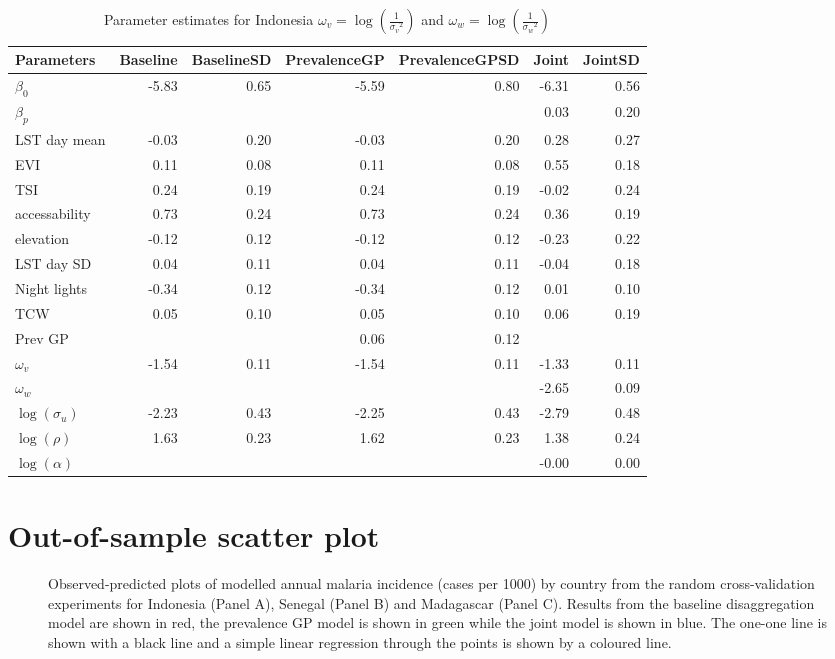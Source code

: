 \documentclass[10pt,a4]{article}
\begin{document}
\begin{table}[ht]
\centering
\begin{tabular}{lrrrrrr}
  \hline
Parameters & Baseline & BaselineSD & PrevalenceGP & PrevalenceGPSD & Joint & JointSD \\ 
  \hline
$\beta_0$ & -5.83 & 0.65 & -5.59 & 0.80 & -6.31 & 0.56 \\ 
  $\beta_p$ &  &  &  &  & 0.03 & 0.20 \\ 
  LST day mean & -0.03 & 0.20 & -0.03 & 0.20 & 0.28 & 0.27 \\ 
  EVI & 0.11 & 0.08 & 0.11 & 0.08 & 0.55 & 0.18 \\ 
  TSI & 0.24 & 0.19 & 0.24 & 0.19 & -0.02 & 0.24 \\ 
  accessability & 0.73 & 0.24 & 0.73 & 0.24 & 0.36 & 0.19 \\ 
  elevation & -0.12 & 0.12 & -0.12 & 0.12 & -0.23 & 0.22 \\ 
  LST day SD & 0.04 & 0.11 & 0.04 & 0.11 & -0.04 & 0.18 \\ 
  Night lights & -0.34 & 0.12 & -0.34 & 0.12 & 0.01 & 0.10 \\ 
  TCW & 0.05 & 0.10 & 0.05 & 0.10 & 0.06 & 0.19 \\ 
  Prev GP &  &  & 0.06 & 0.12 &  &  \\ 
  $\omega_v$ & -1.54 & 0.11 & -1.54 & 0.11 & -1.33 & 0.11 \\ 
  $\omega_w$ &  &  &  &  & -2.65 & 0.09 \\ 
  $\log(\sigma_u)$ & -2.23 & 0.43 & -2.25 & 0.43 & -2.79 & 0.48 \\ 
  $\log(\rho)$ & 1.63 & 0.23 & 1.62 & 0.23 & 1.38 & 0.24 \\ 
  $\log(\alpha)$ &  &  &  &  & -0.00 & 0.00 \\ 
   \hline
\end{tabular}
\label{parsidn}
\caption{Parameter estimates for Indonesia $\omega_v = \log\left(\frac{1}{{\sigma_v}^2}\right)$ and $\omega_w = \log\left(\frac{1}{{\sigma_w}^2}\right)$} 
\end{table}


\clearpage
\section{Out-of-sample scatter plot}



\begin{figure}
\caption{\label{randompredobspolyfacet} 
Observed-predicted plots of modelled annual malaria incidence (cases per 1000) by country from the random cross-validation experiments for Indonesia (Panel A), Senegal (Panel B) and Madagascar (Panel C). 
Results from the baseline disaggregation model are shown in red, the prevalence GP model is shown in green while the joint model is shown in blue.
The one-one line is shown with a black line and a simple linear regression through the points is shown by a coloured line.
}

\end{figure}
\end{document}
